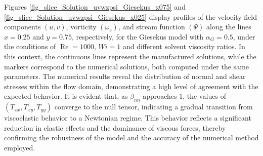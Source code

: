 \documentclass[preprint, 12pt]{elsarticle}
\begin{document}
Figures \ref{fig_slice_Solution_uvwzpsi_Giesekus_x075} and \ref{fig_slice_Solution_uvwzpsi_Giesekus_x025} display profiles of the velocity field components $(u, v)$, vorticity $(\omega_z)$, and stream function $(\Psi)$ along the lines $x=0.25$ and $y=0.75$, respectively, for the Giesekus model with $\alpha_G = 0.5$, under the conditions of $\operatorname{Re}=1000$, $Wi=1$ and different solvent viscosity ratios. In this context, the continuous lines represent the manufactured solutions, while the markers correspond to the numerical solutions, both computed under the same parameters. The numerical results reveal the distribution of normal and shear stresses within the flow domain, demonstrating a high level of agreement with the expected behavior. It is evident that, as $\beta_{nn}$ approaches 1, the values of $(T_{xx}, T_{xy}, T_{yy})$ converge to the null tensor, indicating a gradual transition from viscoelastic behavior to a Newtonian regime. This behavior reflects a significant reduction in elastic effects and the dominance of viscous forces, thereby confirming the robustness of the model and the accuracy of the numerical method employed.
\end{document}
